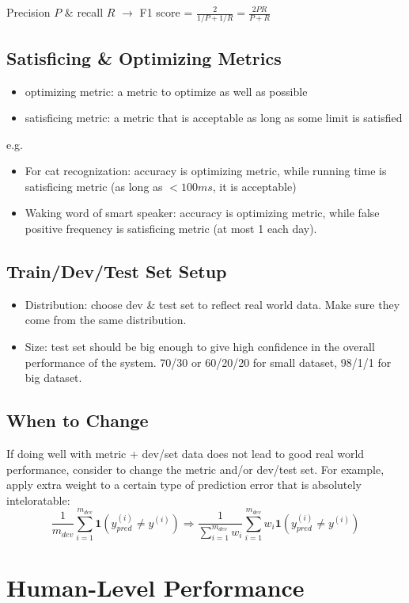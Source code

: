 Precision $P$ \& recall $R$ $\rightarrow$ F1 score = $\frac{2}{1/P+1/R}=\frac{2PR}{P+R}$
\subsection{Satisficing \& Optimizing Metrics}
\begin{itemize}
  \item optimizing metric: a metric to optimize as well as possible
  \item satisficing metric: a metric that is acceptable as long as some limit is satisfied
\end{itemize}
e.g. 
\begin{itemize}
  \item For cat recognization: accuracy is optimizing metric, while running time is satisficing metric (as long as $<100ms$, it is acceptable)
  \item Waking word of smart speaker: accuracy is optimizing metric, while false positive frequency is satisficing metric (at most 1 each day).
\end{itemize}
\subsection{Train/Dev/Test Set Setup}
\begin{itemize}
  \item Distribution: choose dev \& test set to reflect real world data. Make sure they come from the same distribution.
  \item Size: test set should be big enough to give high confidence in the overall performance of the system. 70/30 or 60/20/20 for small dataset, 98/1/1 for big dataset.
\end{itemize}
\subsection{When to Change}
If doing well with metric + dev/set data does not lead to good real world performance, consider to change the metric and/or dev/test set. For example, apply extra weight to a certain type of prediction error that is absolutely inteloratable:
\[\frac{1}{m_{dev}}\displaystyle\sum_{i=1}^{m_{dev}}\mathbf{1}\left(y^{(i)}_{pred}\neq y^{(i)}\right)\Rightarrow\frac{1}{\sum_{i=1}^{m_{dev}}w_i}\displaystyle\sum_{i=1}^{m_{dev}}w_i\mathbf{1}\left(y^{(i)}_{pred}\neq y^{(i)}\right)\]
\section{Human-Level Performance}
